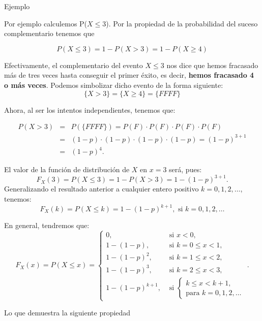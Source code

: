 \documentclass[
  letterpaper,
  DIV=11,
  numbers=noendperiod]{scrreprt}
\begin{document}
\begin{Ejemplo}{Ejemplo}{}

Por ejemplo calculemos P(\(X\leq 3\)). Por la propiedad de la
probabilidad del suceso complementario tenemos que

\[
P(X\leq 3 )=1-P(X> 3)=1-P(X\geq 4)
\]

Efectivamente, el complementario del evento \(X\leq 3\) nos dice que
hemos fracasado más de tres veces hasta conseguir el primer éxito, es
decir, \textbf{hemos fracasado 4 o más veces}. Podemos simbolizar dicho
evento de la forma siguiente: \[
\{X>3\}=\{X\geq 4\}= \{FFFF\}
\]

Ahora, al ser los intentos independientes, tenemos que:

\begin{eqnarray*}
P(X>3) & = & P(\{FFFF\})= P(F)\cdot P(F)\cdot P(F)\cdot P(F)\\
&=& (1-p)\cdot (1-p)\cdot (1-p)\cdot (1-p)= (1-p)^{3+1}\\
&=&(1-p)^{4}.
\end{eqnarray*}

El valor de la función de distribución de \(X\) en \(x=3\) será, pues:
\[F_X(3)=P(X\leq 3)=1-P(X>3)=1-(1-p)^{3+1}.\] Generalizando el resultado
anterior a cualquier entero positivo \(k=0,1,2,\ldots\), tenemos:
\[F_X(k)=P(X\leq k)=1-(1-p)^{k+1},\mbox{ si } k=0,1,2,\ldots\]

En general, tendremos que: \[
F_X(x)=P(X\leq x)=
\left\{\begin{array}{ll} 
0, & \mbox{ si } x<0,\\
1- (1-p), & \mbox{ si } k=0\leq x <1,\\
1- (1-p)^2, & \mbox{ si } k=1\leq x <2,\\
1- (1-p)^3, & \mbox{ si } k=2\leq x <3,\\
1- (1-p)^{k+1}, & \mbox{ si } \left\{ \begin{array}{l}k\leq x< k+1,\\\mbox{para } k=0,1,2,\ldots\end{array}
 \right.
\end{array}
\right..
\]

\end{Ejemplo}

Lo que demuestra la siguiente propiedad
\end{document}
